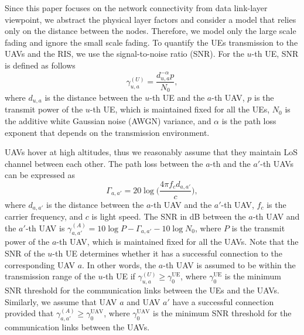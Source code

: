 \documentclass[conference]{IEEEtran}
\begin{document}
 Since this paper focuses on the network connectivity from data link-layer viewpoint, we abstract the physical layer factors and consider a model that relies only on the distance between the nodes. Therefore, we model only the large scale fading and ignore the small scale fading. To quantify the UEs transmission to the UAVs and the RIS, we use the signal-to-noise ratio (SNR). For the $u$-th UE, SNR is defined as follows \cite{8292633}
\begin{equation}
\gamma^{(U)}_{u,a}=\frac{d_{u,a}^{-\alpha}p}{N_0},
\end{equation}
where $d_{u,a}$ is the distance between the $u$-th UE and the $a$-th UAV, $p$ is the transmit power of the $u$-th UE, which is maintained fixed for all the UEs, $N_0$ is the additive white Gaussian noise (AWGN) variance, and $\alpha$ is the path loss exponent that depends on the transmission environment.

UAVs hover at high altitudes, thus we reasonably  assume that they maintain LoS channel between each other. The path loss between the $a$-th and the $a'$-th UAVs can be expressed as
\begin{equation}
\Gamma_{a,a'}=20\log\bigg( \frac{4 \pi f_c d_{a,a'}}{c} \bigg),
\end{equation}
where $d_{a,a'}$ is the distance between the $a$-th UAV and the $a'$-th UAV, $f_c$ is the carrier frequency, and $c$ is light speed. The SNR in dB between the $a$-th UAV and the $a'$-th UAV is $\gamma^{(A)}_{a,a'}=10\log P-\Gamma_{a,a'}-10 \log N_0$, where $P$ is the transmit power of the $a$-th UAV, which is maintained fixed for all the UAVs. Note that the SNR of the $u$-th UE determines whether it has a successful connection to the corresponding UAV $a$. In other words, the $a$-th UAV is assumed to be within the transmission range of the $u$-th UE if $\gamma^{(U)}_{u,a} \geq \gamma^\text{UE}_{0}$, where $\gamma^\text{UE}_{0}$ is the minimum SNR threshold for the communication links between the UEs and the UAVs.  Similarly, we assume that UAV $a$ and UAV $a'$ have a successful connection provided that $\gamma^{(A)}_{a,a'} \geq \gamma^\text{UAV}_{0}$, where $\gamma^\text{UAV}_{0}$ is the minimum SNR threshold for the communication links between the UAVs. 
\end{document}
